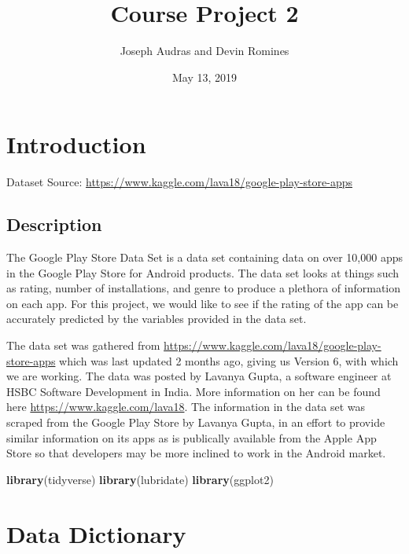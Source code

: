 \documentclass[]{article}
\title{Course Project 2}
\author{Joseph Audras and Devin Romines}
\date{May 13, 2019}
\newenvironment{Shaded}{\begin{snugshade}}{\end{snugshade}}
\newcommand{\KeywordTok}[1]{\textcolor[rgb]{0.13,0.29,0.53}{\textbf{#1}}}
\newcommand{\NormalTok}[1]{#1}
\begin{document}
\maketitle

\hypertarget{introduction}{%
\section{Introduction}\label{introduction}}

Dataset Source:
\url{https://www.kaggle.com/lava18/google-play-store-apps}

\hypertarget{description}{%
\subsection{Description}\label{description}}

The Google Play Store Data Set is a data set containing data on over
10,000 apps in the Google Play Store for Android products. The data set
looks at things such as rating, number of installations, and genre to
produce a plethora of information on each app. For this project, we
would like to see if the rating of the app can be accurately predicted
by the variables provided in the data set.

The data set was gathered from
\url{https://www.kaggle.com/lava18/google-play-store-apps} which was
last updated 2 months ago, giving us Version 6, with which we are
working. The data was posted by Lavanya Gupta, a software engineer at
HSBC Software Development in India. More information on her can be found
here \url{https://www.kaggle.com/lava18}. The information in the data
set was scraped from the Google Play Store by Lavanya Gupta, in an
effort to provide similar information on its apps as is publically
available from the Apple App Store so that developers may be more
inclined to work in the Android market.

\begin{Shaded}
\begin{Highlighting}[]
\KeywordTok{library}\NormalTok{(tidyverse)}
\KeywordTok{library}\NormalTok{(lubridate)}
\KeywordTok{library}\NormalTok{(ggplot2)}
\end{Highlighting}
\end{Shaded}

\hypertarget{data-dictionary}{%
\section{Data Dictionary}\label{data-dictionary}}
\end{document}
